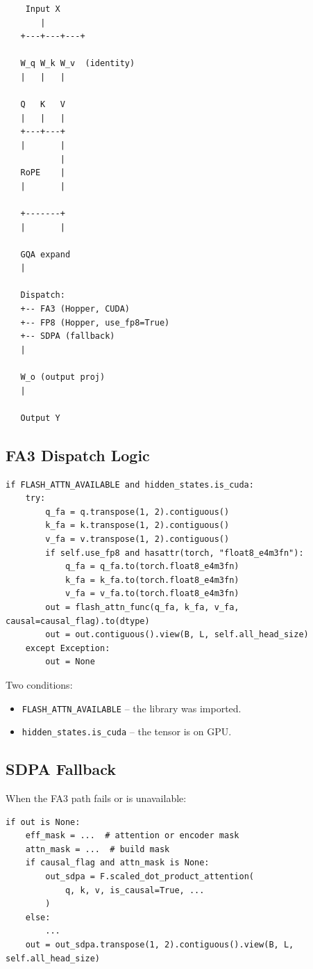 \begin{lstlisting}
    Input X
       |
   +---+---+---+
                
   W_q W_k W_v  (identity)
   |   |   |
            
   Q   K   V
   |   |   |
   +---+---+
   |       |
           |
   RoPE    |
   |       |
            
   +-------+
   |       |
            
   GQA expand
   |
    
   Dispatch:
   +-- FA3 (Hopper, CUDA)
   +-- FP8 (Hopper, use_fp8=True)
   +-- SDPA (fallback)
   |
    
   W_o (output proj)
   |
    
   Output Y
\end{lstlisting}

\subsection{FA3 Dispatch Logic}

\begin{lstlisting}
if FLASH_ATTN_AVAILABLE and hidden_states.is_cuda:
    try:
        q_fa = q.transpose(1, 2).contiguous()
        k_fa = k.transpose(1, 2).contiguous()
        v_fa = v.transpose(1, 2).contiguous()
        if self.use_fp8 and hasattr(torch, "float8_e4m3fn"):
            q_fa = q_fa.to(torch.float8_e4m3fn)
            k_fa = k_fa.to(torch.float8_e4m3fn)
            v_fa = v_fa.to(torch.float8_e4m3fn)
        out = flash_attn_func(q_fa, k_fa, v_fa, causal=causal_flag).to(dtype)
        out = out.contiguous().view(B, L, self.all_head_size)
    except Exception:
        out = None
\end{lstlisting}

Two conditions:
\begin{itemize}
\item \texttt{FLASH\_ATTN\_AVAILABLE} -- the library was imported.
\item \texttt{hidden\_states.is\_cuda} -- the tensor is on GPU.

\end{itemize}
\subsection{SDPA Fallback}

When the FA3 path fails or is unavailable:

\begin{lstlisting}
if out is None:
    eff_mask = ...  # attention or encoder mask
    attn_mask = ...  # build mask
    if causal_flag and attn_mask is None:
        out_sdpa = F.scaled_dot_product_attention(
            q, k, v, is_causal=True, ...
        )
    else:
        ...
    out = out_sdpa.transpose(1, 2).contiguous().view(B, L, self.all_head_size)
\end{lstlisting}


